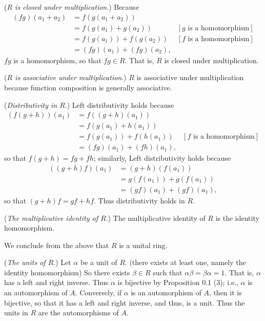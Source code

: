 \begin{enumerate}
      (\textit{$R$ is closed under multiplication}.) Because
      \begin{align*}
         (fg)(a_1 + a_2) &= f(g(a_1 + a_2)) \\
                     &=  f(g(a_1) + g(a_2)) &[g \text{ is a homomorphism}] \\
                     &=  f(g(a_1)) + f(g(a_2)) &[f \text{ is a homomorphism}] \\
                     &= (fg)(a_1) + (fg)(a_2),
      \end{align*}
      $fg$ is a homomorphism, so that $fg \in R$. That is, $R$ is closed under
      multiplication.

      (\textit{$R$ is associative under multiplication}.) $R$ is associative 
      under multiplication because function composition is generally 
      associative.

      (\textit{Distributivity in $R$}.) Left distributivity holds because
      \begin{align*}
         (f(g + h))(a_1) &= f((g + h)(a_1)) \\
            &= f(g(a_1) + h(a_1)) \\
            &= f(g(a_1)) + f(h(a_1)) &[f \text{ is a homomorphism}] \\
            &= (fg)(a_1) + (fh)(a_1),
      \end{align*}
      so that $f(g + h) = fg + fh$; similarly, Left distributivity holds because
      \begin{align*}
         ((g + h)f)(a_1) &= (g + h)(f(a_1)) \\
            &= g(f(a_1)) + g(f(a_1)) \\
            &= (gf)(a_1) + (gf)(a_1),
      \end{align*}
      so that $(g + h)f = gf + hf$. Thus distributivity holds in $R$.

      (\textit{The multiplicative identity of $R$}.) The multiplicative identity 
      of $R$ is the identity homomorphism.

      We conclude from the above that $R$ is a unital ring.

      (\textit{The units of $R$}.) Let $\alpha$ be a unit of $R$. (there exists
      at least one, namely the identity homomorphism) So there exists
      $\beta \in R$ such that $\alpha\beta = \beta\alpha = 1$. That is, $\alpha$
      has a left and right inverse. Thus $\alpha$ is bijective by Proposition
      0.1 (3); i.e., $\alpha$ is an automorphism of $A$. Conversely, if $\alpha$
      is an automorphism of $A$, then it is bijective, so that it has a left and
      right inverse, and thus, is a unit. Thus the units in $R$ are the
      automorphisms of $A$.


\end{enumerate}
